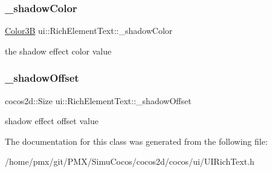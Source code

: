 \subsubsection{\texorpdfstring{\+\_\+shadow\+Color}{\_shadowColor}}
{\footnotesize\ttfamily \hyperlink{structColor3B}{Color3B} ui\+::\+Rich\+Element\+Text\+::\+\_\+shadow\+Color\hspace{0.3cm}{\ttfamily [protected]}}

the shadow effect color value \mbox{\label{classui_1_1RichElementText_a77a101d659638abce928382ff04a022f}} 
\subsubsection{\texorpdfstring{\+\_\+shadow\+Offset}{\_shadowOffset}}
{\footnotesize\ttfamily cocos2d\+::\+Size ui\+::\+Rich\+Element\+Text\+::\+\_\+shadow\+Offset\hspace{0.3cm}{\ttfamily [protected]}}

shadow effect offset value 

The documentation for this class was generated from the following file\+:\begin{DoxyCompactItemize}
\item 
/home/pmx/git/\+P\+M\+X/\+Simu\+Cocos/cocos2d/cocos/ui/U\+I\+Rich\+Text.\+h\end{DoxyCompactItemize}
